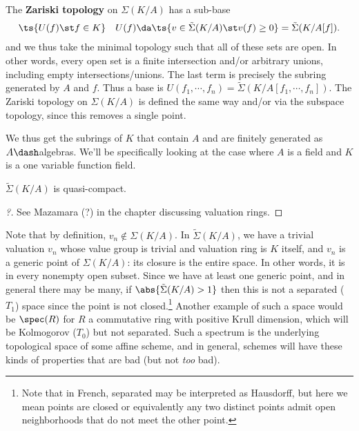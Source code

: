 \begin{definition}

The \textbf{Zariski topology} on \(\Sigma(K/A)\) has a sub-base
\begin{align*}  
\ts{U(f) \st f\in K } && U(f) \da \ts{v\in \tilde \Sigma(K/A) \st v(f) \geq 0} = \tilde \Sigma(K/ A[f])
.\end{align*} and we thus take the minimal topology such that all of
these sets are open. In other words, every open set is a finite
intersection and/or arbitrary unions, including empty
intersections/unions. The last term is precisely the subring generated
by \(A\) and \(f\). Thus a base is
\(U(f_1, \cdots, f_n) = \tilde \Sigma(K / A[f_1, \cdots, f_n])\). The
Zariski topology on \(\Sigma(K/A)\) is defined the same way and/or via
the subspace topology, since this removes a single point.

\end{definition}

\begin{remark}

We thus get the subrings of \(K\) that contain \(A\) and are finitely
generated as \(A\dash\)algebras. We'll be specifically looking at the
case where \(A\) is a field and \(K\) is a one variable function field.

\end{remark}

\begin{theorem}[Zariski]

\(\tilde \Sigma(K/A)\) is quasi-compact.

\end{theorem}

\begin{proof}[?]

See Mazamara (?) in the chapter discussing valuation rings.

\end{proof}

Note that by definition, \(v_n \not\in \Sigma(K/A)\). In
\(\tilde \Sigma(K/A)\), we have a trivial valuation \(v_n\) whose value
group is trivial and valuation ring is \(K\) itself, and \(v_n\) is a
generic point of \(\Sigma(K/A)\): its closure is the entire space. In
other words, it is in every nonempty open subset. Since we have at least
one generic point, and in general there may be many, if
\(\abs{\tilde\Sigma(K/A) > 1}\) then this is not a separated (\(T_1\))
space since the point is not closed.\footnote{Note that in French,
  separated may be interpreted as Hausdorff, but here we mean points are
  closed or equivalently any two distinct points admit open
  neighborhoods that do not meet the other point.} Another example of
such a space would be \(\spec(R)\) for \(R\) a commutative ring with
positive Krull dimension, which will be Kolmogorov (\(T_0\)) but not
separated. Such a spectrum is the underlying topological space of some
affine scheme, and in general, schemes will have these kinds of
properties that are bad (but not \emph{too} bad).


